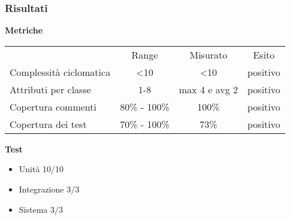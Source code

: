 \begin{frame}
\frametitle{Risultati}


\begin{minipage}[t][0.50\textheight][t]{\textwidth}
\textbf{Metriche}\\
\begin{tabular}{lccc}
\rowcolor{BRow}						    &	Range		& Misurato 		 & Esito \\
\rowcolor{ARow} Complessità ciclomatica & \textless 10	& \textless 10	 & positivo \\
\rowcolor{BRow} Attributi per classe    & 1-8 			& max 4 e avg 2  & positivo \\
\rowcolor{ARow} Copertura commenti 	    & 80\% - 100\%  & 100\%  		 & positivo \\
\rowcolor{BRow} Copertura dei test 	    & 70\% - 100\%  & 73\%  		 & positivo \\
\end{tabular}
\end{minipage}
\begin{minipage}[b][0.50\textheight][t]{\textwidth}
\textbf{Test}
\begin{itemize}
\item Unità 10/10
\item Integrazione 3/3
\item Sistema 3/3
\end{itemize}
\end{minipage}





\end{frame}